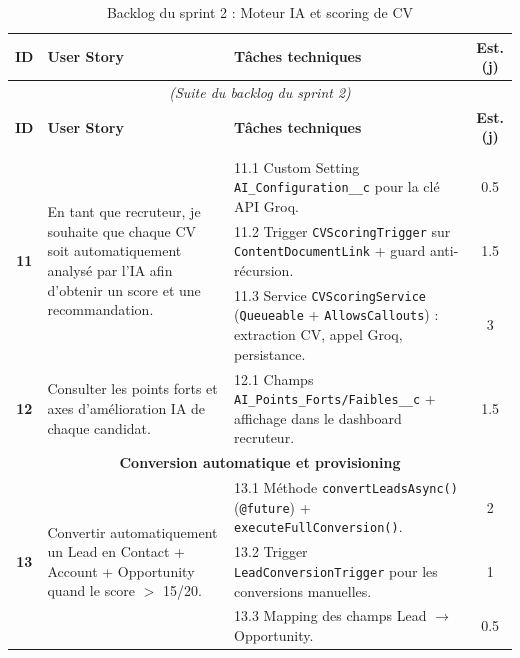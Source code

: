 \begin{longtable}{|c|p{5.5cm}|p{6cm}|c|}
\caption{Backlog du sprint 2 : Moteur IA et scoring de CV} \label{tab:Backlog_sprint2} \\
\hline
\rowcolor{gray!20} \textbf{ID} & \textbf{User Story} & \textbf{Tâches techniques} & \textbf{Est. (j)} \\
\hline
\endfirsthead

\multicolumn{4}{c}{\textit{(Suite du backlog du sprint 2)}} \\
\hline
\rowcolor{gray!20} \textbf{ID} & \textbf{User Story} & \textbf{Tâches techniques} & \textbf{Est. (j)} \\
\hline
\endhead

\hline
\endlastfoot

\multicolumn{4}{|c|}{\cellcolor{green!8}\textbf{Scoring IA --- Analyse automatique des CV}} \\
\hline

\multirow{3}{*}{\textbf{11}} & \multirow{3}{5.5cm}{En tant que recruteur, je souhaite que chaque CV soit automatiquement analysé par l'IA afin d'obtenir un score et une recommandation.} & 11.1 Custom Setting \texttt{AI\_Configuration\_\_c} pour la clé API Groq. & 0.5 \\
\cline{3-4}
 & & 11.2 Trigger \texttt{CVScoringTrigger} sur \texttt{ContentDocumentLink} + guard anti-récursion. & 1.5 \\
\cline{3-4}
 & & 11.3 Service \texttt{CVScoringService} (\texttt{Queueable} + \texttt{AllowsCallouts}) : extraction CV, appel Groq, persistance. & 3 \\
\hline

\textbf{12} & Consulter les points forts et axes d'amélioration IA de chaque candidat. & 12.1 Champs \texttt{AI\_Points\_Forts/Faibles\_\_c} + affichage dans le dashboard recruteur. & 1.5 \\
\hline

\multicolumn{4}{|c|}{\cellcolor{green!8}\textbf{Conversion automatique et provisioning}} \\
\hline

\multirow{3}{*}{\textbf{13}} & \multirow{3}{5.5cm}{Convertir automatiquement un Lead en Contact + Account + Opportunity quand le score $>$ 15/20.} & 13.1 Méthode \texttt{convertLeadsAsync()} (\texttt{@future}) + \texttt{executeFullConversion()}. & 2 \\
\cline{3-4}
 & & 13.2 Trigger \texttt{LeadConversionTrigger} pour les conversions manuelles. & 1 \\
\cline{3-4}
 & & 13.3 Mapping des champs Lead $\rightarrow$ Opportunity. & 0.5 \\
\hline


\end{longtable}

